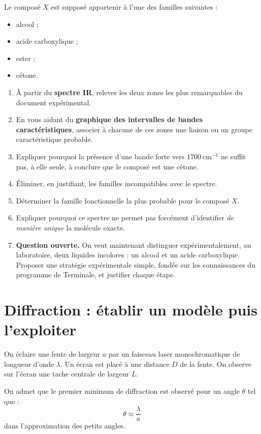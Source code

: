 \documentclass[11pt,a4paper]{article}
\begin{document}
Le composé \(X\) est supposé appartenir à l’une des familles suivantes :
\begin{itemize}
    \item alcool ;
    \item acide carboxylique ;
    \item ester ;
    \item cétone.
\end{itemize}

\begin{enumerate}[label=\textbf{\arabic*.}]
    \item À partir du \textbf{spectre IR}, relever les deux zones les plus remarquables du document expérimental.
    \item En vous aidant du \textbf{graphique des intervalles de bandes caractéristiques}, associer à chacune de ces zones une liaison ou un groupe caractéristique probable.
    \item Expliquer pourquoi la présence d’une bande forte vers \(1700\ \mathrm{cm}^{-1}\) ne suffit pas, à elle seule, à conclure que le composé est une cétone.
    \item Éliminer, en justifiant, les familles incompatibles avec le spectre.
    \item Déterminer la famille fonctionnelle la plus probable pour le composé \(X\).
    \item Expliquer pourquoi ce spectre ne permet pas forcément d’identifier \textit{de manière unique} la molécule exacte.
    \item \textbf{Question ouverte.}  
    On veut maintenant distinguer expérimentalement, au laboratoire, deux liquides incolores : un alcool et un acide carboxylique.  
    Proposer une stratégie expérimentale simple, fondée sur les connaissances du programme de Terminale, et justifier chaque étape.
\end{enumerate}

\section{Diffraction : établir un modèle puis l’exploiter}

On éclaire une fente de largeur \(a\) par un faisceau laser monochromatique de longueur d’onde \(\lambda\).  
Un écran est placé à une distance \(D\) de la fente.  
On observe sur l’écran une tache centrale de largeur \(L\).

On admet que le premier minimum de diffraction est observé pour un angle \(\theta\) tel que :
\[
\theta \approx \frac{\lambda}{a}
\]
dans l’approximation des petits angles.
\end{document}
